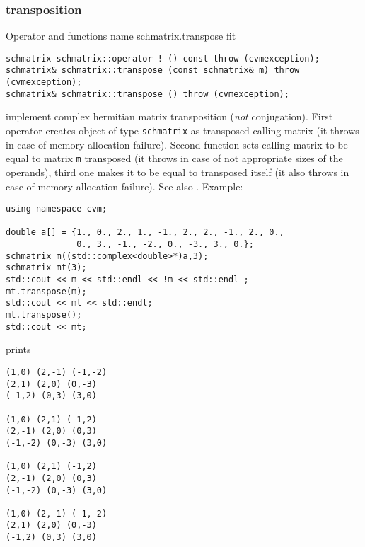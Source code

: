 \subsubsection{transposition}
Operator and functions%
\pdfdest name {schmatrix.transpose} fit
\begin{verbatim}
schmatrix schmatrix::operator ! () const throw (cvmexception);
schmatrix& schmatrix::transpose (const schmatrix& m) throw (cvmexception);
schmatrix& schmatrix::transpose () throw (cvmexception);
\end{verbatim}
implement complex hermitian matrix transposition (\emph{not} conjugation).
First operator creates  object of type \verb"schmatrix" as
 transposed calling matrix
(it throws  
in case of memory allocation failure). 
Second function sets  calling matrix to be equal to  matrix
\verb"m" transposed
(it throws  
in case of not appropriate sizes of the operands), 
third one makes it to be equal to
transposed itself (it also throws  
in case of memory allocation failure). 
See also .
Example:
\begin{Verbatim}
using namespace cvm;

double a[] = {1., 0., 2., 1., -1., 2., 2., -1., 2., 0.,
              0., 3., -1., -2., 0., -3., 3., 0.};
schmatrix m((std::complex<double>*)a,3);
schmatrix mt(3);
std::cout << m << std::endl << !m << std::endl ;
mt.transpose(m);
std::cout << mt << std::endl;
mt.transpose();
std::cout << mt;
\end{Verbatim}
prints
\begin{Verbatim}
(1,0) (2,-1) (-1,-2)
(2,1) (2,0) (0,-3)
(-1,2) (0,3) (3,0)

(1,0) (2,1) (-1,2)
(2,-1) (2,0) (0,3)
(-1,-2) (0,-3) (3,0)

(1,0) (2,1) (-1,2)
(2,-1) (2,0) (0,3)
(-1,-2) (0,-3) (3,0)

(1,0) (2,-1) (-1,-2)
(2,1) (2,0) (0,-3)
(-1,2) (0,3) (3,0)
\end{Verbatim}
\newpage




